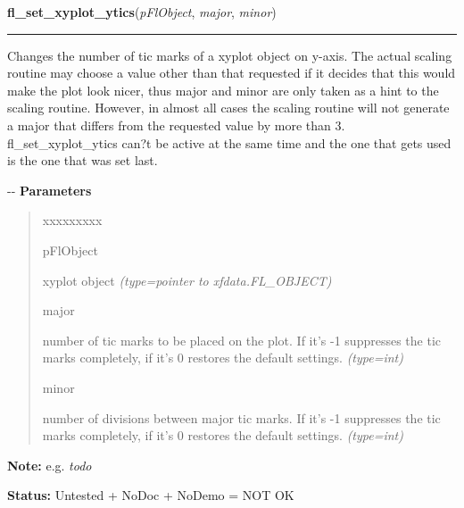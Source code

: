     \label{xformslib:flxyplot:fl_set_xyplot_ytics}

    \vspace{0.5ex}

\hspace{.8\funcindent}\begin{boxedminipage}{\funcwidth}

    \raggedright \textbf{fl\_set\_xyplot\_ytics}(\textit{pFlObject}, \textit{major}, \textit{minor})

    \vspace{-1.5ex}

    \rule{\textwidth}{0.5\fboxrule}
\setlength{\parskip}{2ex}

Changes the number of tic marks of a xyplot object on y-axis. The
actual scaling routine may choose a value other than that requested if it
decides that this would make the plot look nicer, thus major and minor
are only taken as a hint to the scaling routine. However, in almost all
cases the scaling routine will not generate a major that differs from the
requested value by more than 3. fl\_set\_xyplot\_ytics can?t be active at the
same time and the one that gets used is the one that was set last.

-{}-
\setlength{\parskip}{1ex}
      \textbf{Parameters}
      \vspace{-1ex}

      \begin{quote}
        \begin{Ventry}{xxxxxxxxx}

          \item[pFlObject]


xyplot object
            {\it (type=pointer to xfdata.FL\_OBJECT)}

          \item[major]


number of tic marks to be placed on the plot. If it's -1 suppresses
the tic marks completely, if it's 0 restores the default settings.
            {\it (type=int)}

          \item[minor]


number of divisions between major tic marks. If it's -1 suppresses
the tic marks completely, if it's 0 restores the default settings.
            {\it (type=int)}

        \end{Ventry}

      \end{quote}

\textbf{Note:} 
e.g. \emph{todo}


\textbf{Status:} 
Untested + NoDoc + NoDemo = NOT OK


    \end{boxedminipage}

